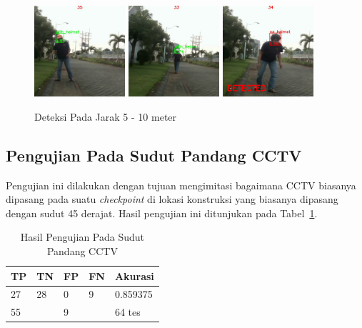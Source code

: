 \begin{figure} [h]
    \centering
    \includegraphics[width=0.3\textwidth]{gambar/sistem_jarak/5-9_bagus/jarak_helmet_orange (67).png}
    \includegraphics[width=0.3\textwidth]{gambar/sistem_jarak/5-9_bagus/jarak_helmet_white (129).png}
    \includegraphics[width=0.3\textwidth]{gambar/sistem_jarak/5-9_bagus/jaraknohelmet (82).png}
    \caption{Deteksi Pada Jarak 5 - 10 meter}
    \label{fig:sys_5-9_meter}  
\end{figure}



\subsection{Pengujian Pada Sudut Pandang CCTV}
\label{subsec:systest_test_cctv}

\par Pengujian ini dilakukan dengan tujuan mengimitasi bagaimana CCTV biasanya dipasang pada suatu \emph{checkpoint} di lokasi konstruksi yang biasanya dipasang dengan sudut 45 derajat. Hasil pengujian ini ditunjukan pada Tabel~\ref{tb:systest_cctv}.


\begin{table}
    \centering
    \caption{Hasil Pengujian Pada Sudut Pandang CCTV}
    \label{tb:systest_cctv}
    \begin{tabular}{|l|l|l|l|l|} 
    \hline
    TP & TN & FP & FN & Akurasi         \\ 
    \hline
    27 & 28 & 0  & 9  & 0.859375         \\ 
    \hline
    \multicolumn{2}{|l|}{55}   & \multicolumn{2}{l|}{9} & 64 tes \\
    \hline
    \end{tabular}
\end{table}

